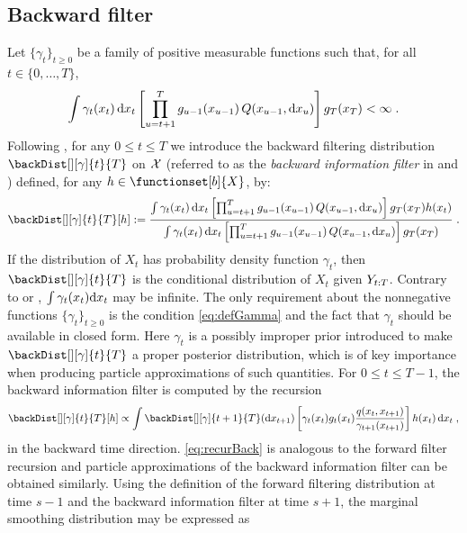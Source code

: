 \subsection{Backward filter}
Let $\{\gamma_t\}_{t \geq 0}$ be a family of positive measurable functions such that, for all $t\in \{0, \ldots, T\}$,
\begin{equation}\label{eq:defGamma}
\int \gamma_t(x_t) \, \mathrm{d} x_t \left[\prod_{u = t+1}^T g_{u-1}(x_{u-1}) \, Q(x_{u-1}, \mathrm{d} x_u) \right] g_T(x_T) < \infty \;.
\end{equation}
Following \cite{briers:doucet:maskell:2010}, for any $0\le t\le T$ we introduce the backward filtering distribution $\backDist[][\gamma]{t}{T}$ on $\mathcal{X}$ (referred to as the  \emph{backward information filter} in \cite{kitagawa:1996} and \cite{briers:doucet:maskell:2010}) defined, for any $h\in \functionset[b]{X}$, by:
\[
\backDist[][\gamma]{t}{T}[h] \eqdef \\
\frac{\int \gamma_t(x_t) \, \rmd x_t\left[\prod_{u=t+1}^T g_{u-1}(x_{u-1}) \, Q(x_{u-1},\rmd x_u)\right] g_T(x_T) h(x_t)}{\int \gamma_t(x_t) \, \rmd x_t \left[ \prod_{u=t+1}^T g_{u-1}(x_{u-1}) \, Q(x_{u-1},\rmd x_u )\right] g_T(x_T)} \eqsp.
\]
If the distribution of $X_t$ has probability density function $\gamma_t$, then $\backDist[][\gamma]{t}{T}$ is the conditional distribution of $X_t$ given $\chunk{Y}{t}{T}$.  Contrary to \cite{briers:doucet:maskell:2010} or \cite{fearnhead:wyncoll:tawn:2010}, $\int \gamma_t(x_t)\mathrm{d} x_t$ may be infinite. The only requirement about the nonnegative functions $\{\gamma_t\}_{t\geq 0}$ is the condition \eqref{eq:defGamma} and the fact that $\gamma_t$ should be available in closed form. Here $\gamma_t$ is a possibly improper prior introduced to make $\backDist[][\gamma]{t}{T}$ a proper posterior distribution, which is of key importance when producing particle approximations of such quantities.
For $0\le t \le T-1$, the backward information filter is computed by the recursion
\begin{equation}
\label{eq:recurBack}
\backDist[][\gamma]{t}{T}[h]\propto \int \backDist[][\gamma]{t+1}{T}(\rmd x_{t+1})\left[\gamma_t(x_t) g_t(x_t) \frac{q(x_t,x_{t+1})}{\gamma_{t+1}(x_{t+1})} \right] h(x_t) \, \rmd x_t \eqsp, 
\end{equation}
in the backward time direction. \eqref{eq:recurBack} is analogous to the forward filter recursion and particle approximations of the backward information filter can be obtained similarly.
Using the definition of the forward filtering distribution at time $s - 1$ and the backward information filter at time $s + 1$, the marginal smoothing distribution may be expressed as
